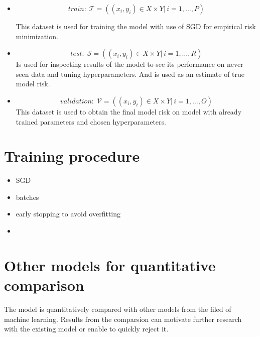 \begin{itemize}
    \item[]
          \begin{equation}
              \label{eq:train}
              \textit{train}: \; \mathcal{T} = ((x_i, y_i) \in X \times Y |\, i = 1,\dots, P)
          \end{equation}

          This dataset is used for training the model with use of \acrlong{SGD} for empirical risk minimization.
          \vspace{3mm}
    \item[]  \begin{equation}
              \label{eq:test}
              \textit{test}:       \; \mathcal{S}  = ((x_i, y_i) \in X \times Y |\, i = 1,\dots, R)
          \end{equation}
          Is used for inspecting results of the model to see its performance on never seen data and tuning hyperparameters. And is used as an estimate of true model risk.
          \vspace{3mm}
    \item[]  \begin{equation}
              \label{eq:validation}
              \textit{validation}: \; \mathcal{V} = ((x_i, y_i) \in X \times Y |\, i = 1,\dots, O)
          \end{equation}
          This dataset is used to obtain the final model risk on model with already trained parameters and chosen hyperparameters.
\end{itemize}

\section{Training procedure}

\begin{itemize}
    \item SGD
    \item batches
    \item early stopping to avoid overfitting
    \item
\end{itemize}


\section{Other models for quantitative comparison}

The model is quantitatively compared with other models from the filed of machine learning. Results from the comparsion can motivate further research with the existing model or enable to quickly reject it.

